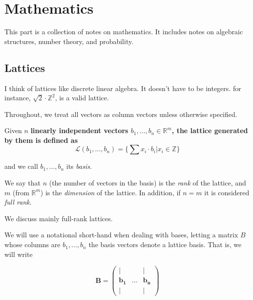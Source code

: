 \part{Mathematics}
This part is a collection of notes on mathematics.
It includes notes on algebraic structures, number theory, and probability. 







\chapter{Lattices}
I think of lattices like discrete linear algebra. 
It doesn't have to be integers. for instance, $\sqrt{2}\cdot \mathbb{Z}^2$, is a valid lattice.

Throughout, we treat all vectors as column vectors unless otherwise specified.

\begin{definition}[lattices]
    Given $n$ \bf{linearly independent} vectors $b_1,\dots, b_n\in \mathbb{R}^m$, the lattice generated by them is defined as
$$ 
\mathcal{L}(b_1,\dots, b_n) = \{\sum{x_i \cdot b_i} | x_i \in \mathbb{Z} \}
$$
    
and we call $b_1,\dots, b_n$ its \emph{basis}.
\end{definition}


\begin{definition}
We say that $n$ (the number of vectors in the basis) is the \emph{rank} of the lattice, and $m$ (from $\mathbb{R}^m$) is the \emph{dimension} of the lattice.
In addition, if $n=m$ it is considered \emph{full rank}.
\end{definition}

We discuss mainly full-rank lattices.


We will use a notational short-hand when dealing with bases, letting a matrix $B$ whose columns are $b_1,\dots, b_n$ the basis vectors denote a lattice basis. That is, we will write

$$ \mathbf{B}=\left(\begin{matrix}| &  & |\\
\mathbf{b_{1}} & \dots & \mathbf{b_{n}}\\
| &  & |
\end{matrix}\right) 
$$

